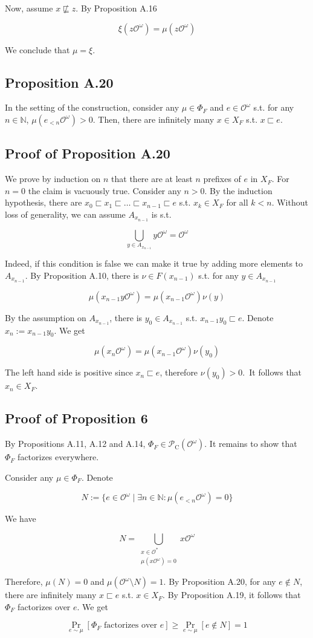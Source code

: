 \documentclass[a4paper]{article}
\DeclareMathOperator{\Prb}{Pr}
\newcommand{\Nats}{\mathbb{N}}
\newcommand{\Obs}{\mathcal{O}}
\newcommand{\ObsO}{\Obs^\omega}
\newcommand{\CC}{\mathcal{P}_{\operatorname{C}}}
\begin{document}
Now, assume ${x \not\sqsubseteq z}$. By Proposition A.16

$$\xi(z\ObsO) = \mu(z\ObsO)$$

We conclude that ${\mu = \xi}$.

\subsection{Proposition A.20}

In the setting of the construction, consider any ${\mu \in \Phi_F}$ and ${e \in \ObsO}$ s.t. for any ${n \in \Nats}$, ${\mu(e_{<n}\ObsO) > 0}$. Then, there are infinitely many ${x \in X_F}$ s.t. ${x \sqsubset e}$.

\subsection{Proof of Proposition A.20}

We prove by induction on ${n}$ that there are at least ${n}$ prefixes of ${e}$ in ${X_F}$. For ${n=0}$ the claim is vacuously true. Consider any ${n > 0}$. By the induction hypothesis, there are ${x_0 \sqsubset x_1 \sqsubset \ldots \sqsubset x_{n-1} \sqsubset e}$ s.t. ${x_k \in X_F}$ for all ${k < n}$. Without loss of generality, we can assume ${A_{x_{n-1}}}$ is s.t.

$$\bigcup_{y \in A_{x_{n-1}}} y\ObsO = \ObsO$$

Indeed, if this condition is false we can make it true by adding more elements to ${A_{x_{n-1}}}$. By Proposition A.10, there is ${\nu \in F(x_{n-1})}$ s.t. for any ${y \in A_{x_{n-1}}}$

$$\mu(x_{n-1}y\ObsO)=\mu(x_{n-1}\ObsO) \nu(y)$$

By the assumption on ${A_{x_{n-1}}}$, there is ${y_0 \in A_{x_{n-1}}}$ s.t. ${x_{n-1}y_0 \sqsubset e}$. Denote ${x_n:=x_{n-1}y_0}$. We get

$$\mu(x_{n}\ObsO)=\mu(x_{n-1}\ObsO) \nu(y_0)$$

The left hand side is positive since ${x_n \sqsubset e}$, therefore ${\nu(y_0) > 0}$.\ It follows that ${x_n \in X_F}$.

\subsection{Proof of Proposition 6}

By Propositions A.11, A.12 and A.14, ${\Phi_F \in \CC(\ObsO)}$. It remains to show that ${\Phi_F}$ factorizes everywhere.

Consider any ${\mu \in \Phi_F}$. Denote

$$N:=\{e \in \ObsO \mid \exists n \in \Nats: \mu(e_{<n}\ObsO)=0\}$$

We have

$$N = \bigcup_{\substack{x \in \Obs^* \\ \mu(x\ObsO)=0}} x\ObsO$$

Therefore, ${\mu(N) = 0}$ and ${\mu(\ObsO \setminus N) = 1}$. By Proposition A.20, for any ${e \not\in N}$, there are infinitely many ${x \sqsubset e}$ s.t. ${x \in X_F}$. By Proposition A.19, it follows that ${\Phi_F}$ factorizes over ${e}$. We get

$$\Prb_{e \sim \mu}[\Phi_F \text{ factorizes over } e] \geq \Prb_{e \sim \mu}[e \not\in N] = 1$$
\end{document}
